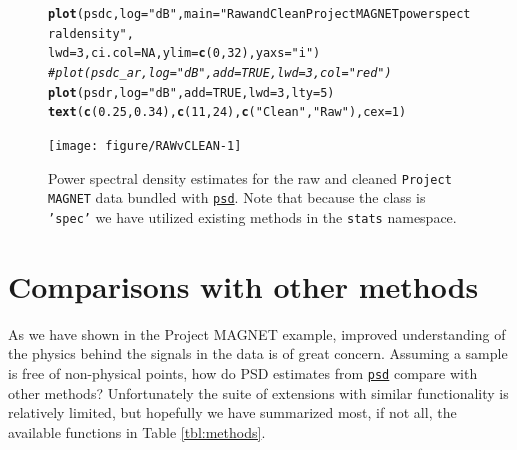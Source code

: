 \documentclass[10pt]{article}\usepackage[]{graphicx}\usepackage[]{color}
\makeatletter
\newcommand{\hlnum}[1]{\textcolor[rgb]{0.686,0.059,0.569}{#1}}%
\newcommand{\hlstr}[1]{\textcolor[rgb]{0.192,0.494,0.8}{#1}}%
\newcommand{\hlcom}[1]{\textcolor[rgb]{0.678,0.584,0.686}{\textit{#1}}}%
\newcommand{\hlstd}[1]{\textcolor[rgb]{0.345,0.345,0.345}{#1}}%
\newcommand{\hlkwc}[1]{\textcolor[rgb]{0.333,0.667,0.333}{#1}}%
\newcommand{\hlkwd}[1]{\textcolor[rgb]{0.737,0.353,0.396}{\textbf{#1}}}%
\newenvironment{kframe}{%
 \def\at@end@of@kframe{}%
 \ifinner\ifhmode%
  \def\at@end@of@kframe{\end{minipage}}%
  \begin{minipage}{\columnwidth}%
 \fi\fi%
 \def\FrameCommand##1{\hskip\@totalleftmargin \hskip-\fboxsep
 \colorbox{shadecolor}{##1}\hskip-\fboxsep
     \hskip-\linewidth \hskip-\@totalleftmargin \hskip\columnwidth}%
 \MakeFramed {\advance\hsize-\width
   \@totalleftmargin\z@ \linewidth\hsize
   \@setminipage}}%
 {\par\unskip\endMakeFramed%
 \at@end@of@kframe}
\newenvironment{knitrout}{}{} %
\newcommand{\Rcmd}[1]{\texttt{#1}}
\newcommand{\psd}[0]{\href{http://abarbour.github.com/psd/}{\color{blue}\Rcmd{psd}}}
\makeatother
\begin{document}
%
\begin{figure}[h!]
\begin{center}
\begin{knitrout}
\color{fgcolor}\begin{kframe}
\begin{alltt}
\hlkwd{plot}\hlstd{(psdc,} \hlkwc{log}\hlstd{=}\hlstr{"dB"}\hlstd{,} \hlkwc{main}\hlstd{=}\hlstr{"Raw and Clean Project MAGNET power spectral density"}\hlstd{,}
       \hlkwc{lwd}\hlstd{=}\hlnum{3}\hlstd{,} \hlkwc{ci.col}\hlstd{=}\hlnum{NA}\hlstd{,} \hlkwc{ylim}\hlstd{=}\hlkwd{c}\hlstd{(}\hlnum{0}\hlstd{,}\hlnum{32}\hlstd{),} \hlkwc{yaxs}\hlstd{=}\hlstr{"i"}\hlstd{)}
\hlcom{#plot(psdc_ar, log="dB", add=TRUE, lwd=3, col="red")}
\hlkwd{plot}\hlstd{(psdr,} \hlkwc{log}\hlstd{=}\hlstr{"dB"}\hlstd{,} \hlkwc{add}\hlstd{=}\hlnum{TRUE}\hlstd{,} \hlkwc{lwd}\hlstd{=}\hlnum{3}\hlstd{,} \hlkwc{lty}\hlstd{=}\hlnum{5}\hlstd{)}
\hlkwd{text}\hlstd{(}\hlkwd{c}\hlstd{(}\hlnum{0.25}\hlstd{,}\hlnum{0.34}\hlstd{),} \hlkwd{c}\hlstd{(}\hlnum{11}\hlstd{,}\hlnum{24}\hlstd{),} \hlkwd{c}\hlstd{(}\hlstr{"Clean"}\hlstd{,}\hlstr{"Raw"}\hlstd{),} \hlkwc{cex}\hlstd{=}\hlnum{1}\hlstd{)}
\end{alltt}
\end{kframe}
\texttt{[image: figure/RAWvCLEAN-1]} 

\end{knitrout}
\caption{Power spectral density estimates for the raw and cleaned
             \Rcmd{Project MAGNET} data bundled with \psd{}. Note that
             because the class is \Rcmd{'spec'} we have
             utilized  existing methods in the \Rcmd{stats} namespace.}
\label{fig:pmag}
\end{center}
\end{figure}

\section{Comparisons with other methods}

As we have shown in the Project MAGNET example, 
improved understanding of the physics behind the signals in the data
is of great concern.
Assuming a sample is free of non-physical points, how do
PSD estimates from \psd{}
compare with other methods?
Unfortunately the suite of extensions with similar functionality
is relatively limited, but hopefully we have
summarized most, if not all, the available functions in Table \ref{tbl:methods}.
\end{document}

